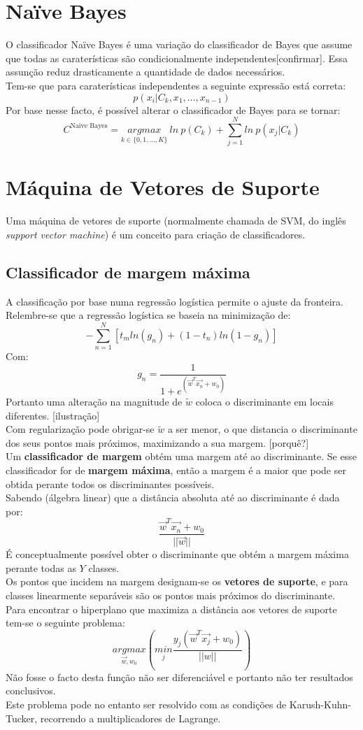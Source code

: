 \documentclass[]{report}
\begin{document}
\section{Naïve Bayes}
O classificador Naïve Bayes é uma variação do classificador de Bayes que assume que todas as caraterísticas são condicionalmente independentes[confirmar]. Essa assunção reduz drasticamente a quantidade de dados necessários.\\[0.2cm]
Tem-se que para caraterísticas independentes a seguinte expressão está correta:
$$ p(x_i | C_k, x_1, \dots , x_{n-1}) $$
Por base nesse facto, é possível alterar o classificador de Bayes para se tornar:
$$C^{\text{Naïve Bayes}} = \underset{k\in \{0,1,\dots,K\}}{argmax} \> ln\> p(C_k) + \sum^N_{j=1} ln \> p(x_j | C_k)$$
\section{Máquina de Vetores de Suporte}
Uma máquina de vetores de suporte (normalmente chamada de SVM, do inglês \textit{support vector machine}) é um conceito para criação de classificadores.
\subsection{Classificador de margem máxima}
A classificação por base numa regressão logística permite o ajuste da fronteira.\\
Relembre-se que a regressão logística se baseia na minimização de:
$$-\sum^N_{n=1}{[t_m ln(g_n) + (1-t_n) ln(1-g_n)]}$$
Com:
$$g_n = \frac{1}{1 + e^{(\vec{w}^T \vec{x_n} + w_0)}}$$
Portanto uma alteração na magnitude de $\tilde{w}$ coloca o discriminante em locais diferentes. [ilustração]\\[0.2cm]
Com regularização pode obrigar-se $\tilde{w}$ a ser menor, o que distancia o discriminante dos seus pontos mais próximos, maximizando a sua margem. [porquê?]\\[0.2cm]
Um \textbf{classificador de margem} obtém uma margem até ao discriminante. Se esse classificador for de \textbf{margem máxima}, então a margem é a maior que pode ser obtida perante todos os discriminantes possíveis.\\[0.2cm]
Sabendo (álgebra linear) que a distância absoluta até ao discriminante é dada por:
$$\frac{\vec{w}^T \vec{x_n} + w_0}{||\vec{w}||}$$
É conceptualmente possível obter o discriminante que obtém a margem máxima perante todas as $Y$ classes.\\
Os pontos que incidem na margem designam-se os \textbf{vetores de suporte}, e para classes linearmente separáveis são os pontos mais próximos do discriminante.\\
Para encontrar o hiperplano que maximiza a distância aos vetores de suporte tem-se o seguinte problema:
$$\underset{\vec{w}, w_0}{argmax}
\left(
\underset{j}{min}
\frac{y_j(\vec{w}^T \vec{x_j} + w_0)}{||w||}
\right)$$
Não fosse o facto desta função não ser diferenciável e portanto não ter resultados conclusivos.\\[0.2cm]
Este problema pode no entanto ser resolvido com as condições de Karush-Kuhn-Tucker, recorrendo a multiplicadores de Lagrange.
\end{document}
